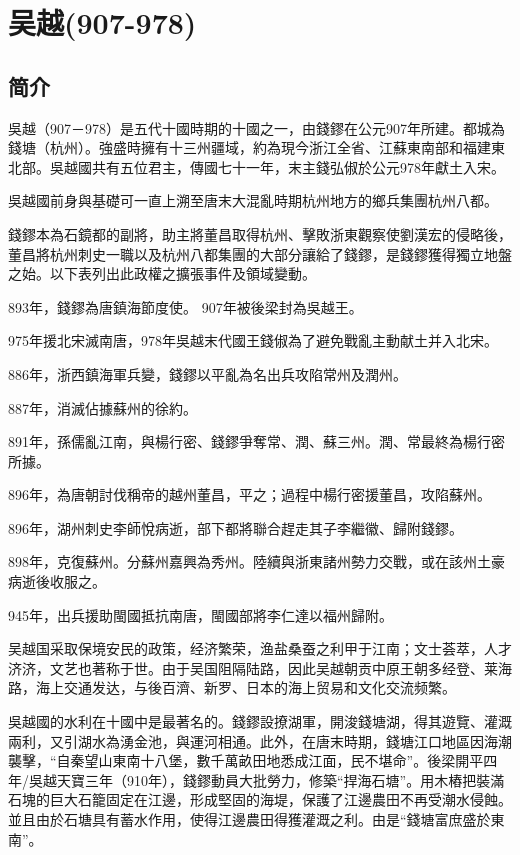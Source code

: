 

\section{吴越\tiny(907-978)}

\subsection{简介}

吳越（907－978）是五代十國時期的十國之一，由錢鏐在公元907年所建。都城為錢塘（杭州）。強盛時擁有十三州疆域，約為現今浙江全省、江蘇東南部和福建東北部。吳越國共有五位君主，傳國七十一年，末主錢弘俶於公元978年獻土入宋。

吳越國前身與基礎可一直上溯至唐末大混亂時期杭州地方的鄉兵集團杭州八都。

錢鏐本為石鏡都的副將，助主將董昌取得杭州、擊敗浙東觀察使劉漢宏的侵略後，董昌將杭州刺史一職以及杭州八都集團的大部分讓給了錢鏐，是錢鏐獲得獨立地盤之始。以下表列出此政權之擴張事件及領域變動。

893年，錢鏐為唐鎮海節度使。 907年被後梁封為吳越王。

975年援北宋滅南唐，978年吳越末代國王錢俶為了避免戰亂主動献土并入北宋。

886年，浙西鎮海軍兵變，錢鏐以平亂為名出兵攻陷常州及潤州。

887年，消滅佔據蘇州的徐約。

891年，孫儒亂江南，與楊行密、錢鏐爭奪常、潤、蘇三州。潤、常最終為楊行密所據。

896年，為唐朝討伐稱帝的越州董昌，平之；過程中楊行密援董昌，攻陷蘇州。

896年，湖州刺史李師悅病逝，部下都將聯合趕走其子李繼徽、歸附錢鏐。

898年，克復蘇州。分蘇州嘉興為秀州。陸續與浙東諸州勢力交戰，或在該州土豪病逝後收服之。

945年，出兵援助閩國抵抗南唐，閩國部將李仁達以福州歸附。

吴越国采取保境安民的政策，经济繁荣，渔盐桑蚕之利甲于江南；文士荟萃，人才济济，文艺也著称于世。由于吴国阻隔陆路，因此吴越朝贡中原王朝多经登、莱海路，海上交通发达，与後百濟、新罗、日本的海上贸易和文化交流频繁。

吳越國的水利在十國中是最著名的。錢鏐設撩湖軍，開浚錢塘湖，得其遊覽、灌溉兩利，又引湖水為湧金池，與運河相通。此外，在唐末時期，錢塘江口地區因海潮襲擊，“自秦望山東南十八堡，數千萬畝田地悉成江面，民不堪命”。後梁開平四年/吳越天寶三年（910年），錢鏐動員大批勞力，修築“捍海石塘”。用木樁把裝滿石塊的巨大石籠固定在江邊，形成堅固的海堤，保護了江邊農田不再受潮水侵蝕。並且由於石塘具有蓄水作用，使得江邊農田得獲灌溉之利。由是“錢塘富庶盛於東南”。

